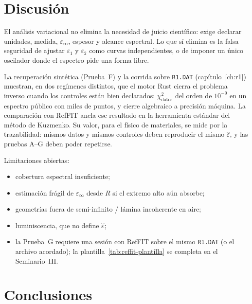 \chapter{Discusi\'on}
\label{ch:discusion}

El an\'alisis variacional no elimina la necesidad de juicio cient\'ifico: exige declarar unidades, medida, $\varepsilon_\infty$, espesor y alcance espectral.
Lo que s\'i elimina es la falsa seguridad de ajustar $\varepsilon_1$ y $\varepsilon_2$ como curvas independientes, o de imponer un \'unico oscilador donde el espectro pide una forma libre.

La recuperaci\'on sint\'etica (Prueba~F) y la corrida sobre \texttt{R1.DAT} (cap\'itulo~\ref{ch:r1}) muestran, en dos reg\'imenes distintos, que el motor Rust cierra el problema inverso cuando los controles est\'an bien declarados:
$\chi^{2}_{\mathrm{datos}}$ del orden de $10^{-9}$ en un espectro p\'ublico con miles de puntos, y cierre algebraico a precisi\'on m\'aquina.
La comparaci\'on con RefFIT ancla ese resultado en la herramienta est\'andar del m\'etodo de Kuzmenko.
Su valor, para el f\'isico de materiales, se mide por la trazabilidad:
mismos datos y mismos controles deben reproducir el mismo $\hat\varepsilon$, y las pruebas A--G deben poder repetirse.

Limitaciones abiertas:
\begin{itemize}[leftmargin=*]
\item cobertura espectral insuficiente;
\item estimaci\'on fr\'agil de $\varepsilon_\infty$ desde $R$ si el extremo alto a\'un absorbe;
\item geometr\'ias fuera de semi-infinito / l\'amina incoherente en aire;
\item luminiscencia, que no define $\hat\varepsilon$;
\item la Prueba~G requiere una sesi\'on con RefFIT sobre el mismo \texttt{R1.DAT} (o el archivo acordado); la plantilla~\ref{tab:reffit-plantilla} se completa en el Seminario~III.
\end{itemize}


\chapter{Conclusiones}
\label{ch:conclusiones}

